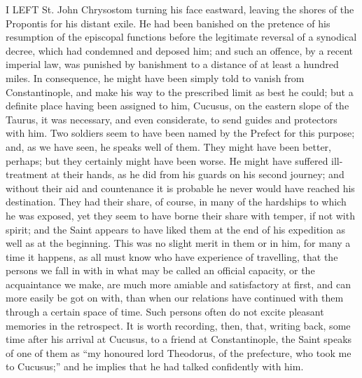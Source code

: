 I LEFT St. John Chrysostom turning his
face eastward, leaving the shores of the Propontis for his distant
exile. He had been banished on the pretence of his resumption of the
episcopal functions before the legitimate reversal of a synodical
decree, which had condemned and deposed him; and such an offence, by a
recent imperial law, was punished by banishment to a distance of at
least a hundred miles. In consequence, he might have been simply told
to vanish from Constantinople, and make his way to the prescribed
limit as best he could; but a definite place having been assigned to
him, Cucusus, on the eastern slope of the Taurus, it was necessary,
and even considerate, to send guides and protectors with him. Two
soldiers seem to have been named by the Prefect for this purpose; and,
as we have seen, he speaks well of them. They might have been better,
perhaps; but they certainly might have been worse. He might have
suffered ill-treatment at their hands, as he did from his guards on
his second journey; and without their aid and countenance it is
probable he never would have reached his destination. They had their
share, of course, in many of the hardships to which he was
exposed, yet they seem to have borne their share with temper, if not
with spirit; and the Saint appears to have liked them at the end of
his expedition as well as at the beginning. This was no slight merit
in them or in him, for many a time it happens, as all must know who
have experience of travelling, that the persons we fall in with in
what may be called an official capacity, or the acquaintance we make,
are much more amiable and satisfactory at first, and can more easily
be got on with, than when our relations have continued with them
through a certain space of time. Such persons often do not excite
pleasant memories in the retrospect. It is worth recording, then,
that, writing back, some time after his arrival at Cucusus, to a
friend at Constantinople, the Saint speaks of one of them as ``my
honoured lord Theodorus, of the prefecture, who took me to Cucusus;''
and he implies that he had talked confidently with him.

